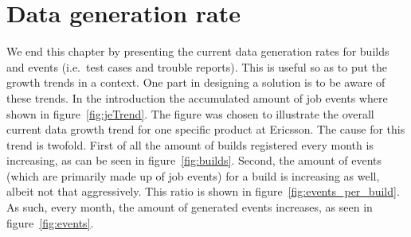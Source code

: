 %
%


%
%

\section{Data generation rate}
\label{datagenrate}
We end this chapter by presenting the current data generation rates for builds and events (i.e.\ test cases and trouble reports). This is useful so as to put the growth trends in a context. One part in designing a solution is to be aware of these trends. In the introduction the accumulated amount of job events where shown in figure~\ref{fig:jeTrend}. The figure was chosen to illustrate the overall current data growth trend for one specific product at Ericsson. The cause for this trend is twofold. First of all the amount of builds registered every month is increasing, as can be seen in figure~\ref{fig:builds}. Second, the amount of events (which are primarily made up of job events) for a build is increasing as well, albeit not that aggressively. This ratio is shown in figure~\ref{fig:events_per_build}. As such, every month, the amount of generated events increases, as seen in figure~\ref{fig:events}.

